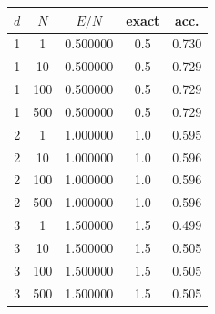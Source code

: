 \begin{center}
\label{tab:1b-validation}
\setlength{\tabcolsep}{3.2pt}
\begin{tabular}{@{}ccccc@{}}
\toprule
$d$ & $N$ & $E/N$ & exact & acc. \\
\midrule
1 & 1 & 0.500000 & 0.5 & 0.730 \\
1 & 10 & 0.500000 & 0.5 & 0.729 \\
1 & 100 & 0.500000 & 0.5 & 0.729 \\
1 & 500 & 0.500000 & 0.5 & 0.729 \\
2 & 1 & 1.000000 & 1.0 & 0.595 \\
2 & 10 & 1.000000 & 1.0 & 0.596 \\
2 & 100 & 1.000000 & 1.0 & 0.596 \\
2 & 500 & 1.000000 & 1.0 & 0.596 \\
3 & 1 & 1.500000 & 1.5 & 0.499 \\
3 & 10 & 1.500000 & 1.5 & 0.505 \\
3 & 100 & 1.500000 & 1.5 & 0.505 \\
3 & 500 & 1.500000 & 1.5 & 0.505 \\
\bottomrule
\end{tabular}
\end{center}

